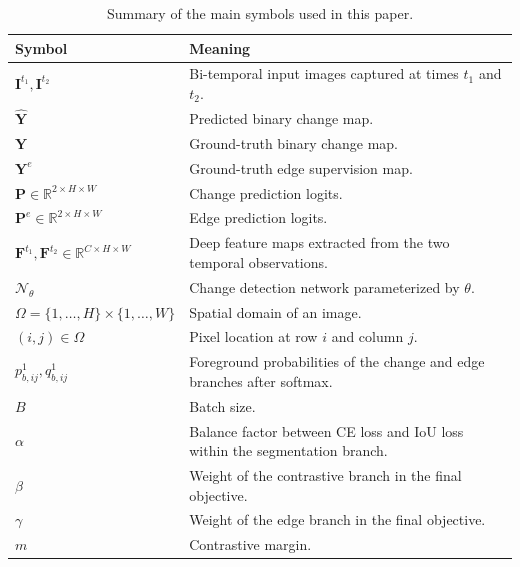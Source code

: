        \begin{table}[t]
            \centering
            \caption{Summary of the main symbols used in this paper.}
            \label{tab:notations}
            \footnotesize
            \setlength{\tabcolsep}{4pt}
            \renewcommand{\arraystretch}{1.15}
            \begin{tabular}{>{\raggedright\arraybackslash}p{}>{\raggedright\arraybackslash}p{}}
                \hline
                Symbol & Meaning \\
                \hline
                $\mathbf{I}^{t_1}, \mathbf{I}^{t_2}$ & Bi-temporal input images captured at times $t_1$ and $t_2$. \\
                $\hat{\mathbf{Y}}$ & Predicted binary change map. \\
                $\mathbf{Y}$ & Ground-truth binary change map. \\
                $\mathbf{Y}^{e}$ & Ground-truth edge supervision map. \\
                $\mathbf{P}\in\mathbb{R}^{2\times H\times W}$ & Change prediction logits. \\
                $\mathbf{P}^{e}\in\mathbb{R}^{2\times H\times W}$ & Edge prediction logits. \\
                $\mathbf{F}^{t_1}, \mathbf{F}^{t_2}\in\mathbb{R}^{C\times H\times W}$ & Deep feature maps extracted from the two temporal observations. \\
                $\mathcal{N}_{\theta}$ & Change detection network parameterized by $\theta$. \\
                $\Omega=\{1,\ldots,H\}\times\{1,\ldots,W\}$ & Spatial domain of an image. \\
                $(i,j)\in\Omega$ & Pixel location at row $i$ and column $j$. \\
                $p^{1}_{b,ij}, q^{1}_{b,ij}$ & Foreground probabilities of the change and edge branches after softmax. \\
                $B$ & Batch size. \\
                $\alpha$ & Balance factor between CE loss and IoU loss within the segmentation branch. \\
                $\beta$ & Weight of the contrastive branch in the final objective. \\
                $\gamma$ & Weight of the edge branch in the final objective. \\
                $m$ & Contrastive margin. \\

\end{tabular}
\end{table}
